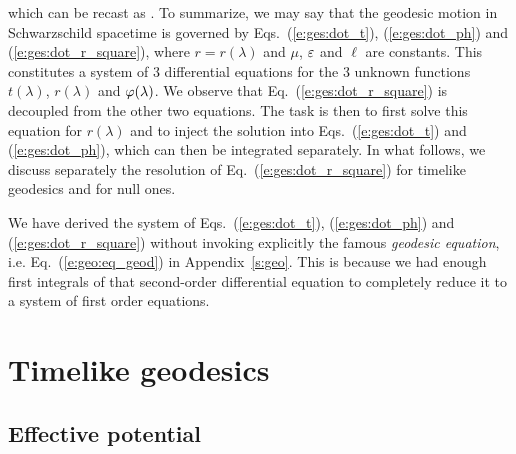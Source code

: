 which can be recast as
\be \label{e:ges:dot_r_square}
     .
\ee
To summarize, we may say that the geodesic motion in Schwarzschild spacetime is governed by
Eqs.~(\ref{e:ges:dot_t}), (\ref{e:ges:dot_ph}) and (\ref{e:ges:dot_r_square}),
where $r=r(\lambda)$ and $\mu$, $\varepsilon$ and $\ell$ are constants.
This constitutes a system of 3 differential equations for the 3 unknown
functions $t(\lambda)$, $r(\lambda)$ and $\varphi(\lambda)$.
We observe
that Eq.~(\ref{e:ges:dot_r_square}) is decoupled from the other two equations.
The task is then to first solve this equation for $r(\lambda)$ and to inject
the solution into Eqs.~(\ref{e:ges:dot_t}) and (\ref{e:ges:dot_ph}), which
can then be integrated separately.
In what follows, we discuss separately the resolution of
Eq.~(\ref{e:ges:dot_r_square}) for timelike geodesics and for null ones.

\begin{remark}
We have derived the system of Eqs.~(\ref{e:ges:dot_t}), (\ref{e:ges:dot_ph}) and (\ref{e:ges:dot_r_square}) without invoking explicitly the
famous \emph{geodesic equation}, i.e.
Eq.~(\ref{e:geo:eq_geod}) in Appendix~\ref{s:geo}.
This is because we had enough
first integrals of that second-order differential equation to completely reduce it to
a system of first order equations.
\end{remark}

\section{Timelike geodesics}

\subsection{Effective potential}

